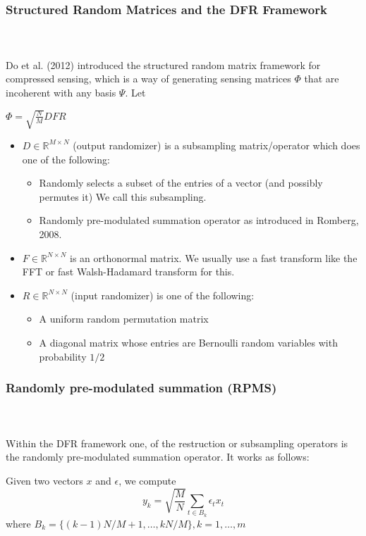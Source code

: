 
\begin{frame}[t]
	\frametitle{Structured Random Matrices and the DFR Framework}
	\framesubtitle{~~}  %

	Do et al. (2012) introduced the structured random matrix framework for compressed sensing,
	which is a way of generating sensing matrices $\Phi$ that are incoherent with any basis $\Psi$. Let 

	\centering
	$	\Phi = \sqrt{\frac{N}{M}}DFR$

	\begin{itemize}
	\item $D\in \mathbb{R}^{M\times N}$ (output randomizer) is a subsampling matrix/operator which does one of the following:
		\begin{itemize}
		\item Randomly selects a subset of the entries of a vector (and possibly permutes it) We call this subsampling.
		\item Randomly pre-modulated summation operator as introduced in Romberg, 2008.
		\end{itemize}
	\item $F\in\mathbb{R}^{N\times N}$ is an orthonormal matrix. We usually use a fast transform like the FFT or 
		fast Walsh-Hadamard transform for this.
	\item $R\in\mathbb{R}^{N\times N}$ (input randomizer) is one of the following:
		\begin{itemize}
			\item A uniform random permutation matrix
			\item A diagonal matrix whose entries are Bernoulli random variables with probability $1/2$
		\end{itemize}
	\end{itemize}

\end{frame}

\begin{frame}[t]
	\frametitle{Randomly pre-modulated summation (RPMS)}
	\framesubtitle{~~}  %
	
	Within the DFR framework one, of the restruction or subsampling operators is the
	randomly pre-modulated summation operator. It works as follows:

	Given two vectors $x$ and $\epsilon$, we compute
	\begin{equation}
		y_k = \sqrt{\frac{M}{N}}\sum_{t\in B_k}\epsilon_t x_t
	\end{equation}
	where
	$B_k = \{(k-1)N/M + 1, \ldots, kN/M  \}, k = 1,\ldots,m$

\end{frame}

